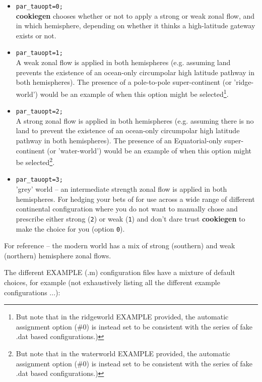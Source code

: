 \vspace{1mm}
\begin{itemize}
\item \texttt{par\_tauopt=0;}
\\\textbf{cookiegen} chooses whether or not to apply a strong or weak zonal flow, and in which hemisphere, depending on whether it thinks a high-latitude gateway exists or not.
\item \texttt{par\_tauopt=1;}
\\A weak zonal flow is applied in both hemispheres (e.g. assuming land prevents the existence of an ocean-only circumpolar high latitude pathway  in both hemispheres).
The presence of a pole-to-pole super-continent (or 'ridge-world') would be an example of when this option might be selected\footnote{But note that in the ridgeworld EXAMPLE provided, the automatic assignment option (\#0) is instead set to be consistent with the series of fake .dat based configurations.)}.
\item \texttt{par\_tauopt=2;}
\\A strong zonal flow is applied in both hemispheres (e.g. assuming there is no land to prevent the existence of an ocean-only circumpolar high latitude pathway  in both hemispheres). The presence of an Equatorial-only super-continent (or 'water-world') would be an example of when this option might be selected\footnote{But note that in the waterworld EXAMPLE provided, the automatic assignment option (\#0) is instead set to be consistent with the series of fake .dat based configurations.)}.
\item \texttt{par\_tauopt=3;}
\\'grey' world -- an intermediate strength zonal flow is applied in both hemispheres. For hedging your bets of for use across a wide range of different continental configuration where you do not want to manually chose and prescribe either strong (\texttt{2}) or weak (\texttt{1}) and don't dare trust \textbf{cookiegen} to make the choice for you (option \texttt{0}).
\end{itemize}
\vspace{1mm}

For reference -- the modern world has a mix of strong (southern) and weak (northern) hemisphere zonal flows.

The different \textsf{\footnotesize EXAMPLE} (\textsf{\footnotesize .m}) configuration files have a mixture of default choices, for example (not exhaustively listing all the different example configurations ...):

